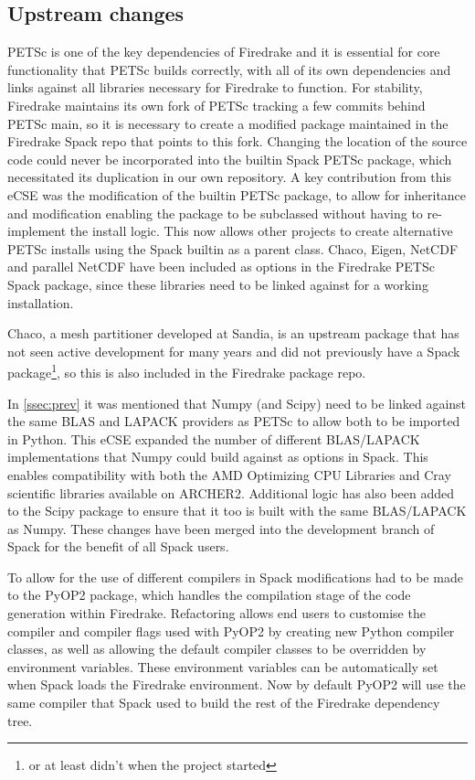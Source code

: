 \documentclass[a4paper,11pt]{article}
\begin{document}
\subsection{Upstream changes}
\label{ssec:changes}
PETSc is one of the key dependencies of Firedrake and it is essential for core functionality that PETSc builds correctly, with all of its own dependencies and links against all libraries necessary for Firedrake to function.
For stability, Firedrake maintains its own fork of PETSc tracking a few commits behind PETSc main, so it is necessary to create a modified package maintained in the Firedrake Spack repo that points to this fork.
Changing the location of the source code could never be incorporated into the builtin Spack PETSc package, which necessitated its duplication in our own repository.
A key contribution from this eCSE was the modification of the builtin PETSc package, to allow for inheritance and modification enabling the package to be subclassed without having to re-implement the install logic.
This now allows other projects to create alternative PETSc installs using the Spack builtin as a parent class.
Chaco, Eigen, NetCDF and parallel NetCDF have been included as options in the Firedrake PETSc Spack package, since these libraries need to be linked against for a working installation.

Chaco, a mesh partitioner developed at Sandia, is an upstream package that has not seen active development for many years and did not previously have a Spack package\footnote{or at least didn't when the project started}, so this is also included in the Firedrake package repo.

In \cref{ssec:prev} it was mentioned that Numpy (and Scipy) need to be linked against the same BLAS and LAPACK providers as PETSc to allow both to be imported in Python.
This eCSE expanded the number of different BLAS/LAPACK implementations that Numpy could build against as options in Spack.
This enables compatibility with both the AMD Optimizing CPU Libraries and Cray scientific libraries available on ARCHER2.
Additional logic has also been added to the Scipy package to ensure that it too is built with the same BLAS/LAPACK as Numpy.
These changes have been merged into the development branch of Spack for the benefit of all Spack users.

To allow for the use of different compilers in Spack modifications had to be made to the PyOP2 package, which handles the compilation stage of the code generation within Firedrake.
Refactoring allows end users to customise the compiler and compiler flags used with PyOP2 by creating new Python compiler classes, as well as allowing the default compiler classes to be overridden by environment variables.
These environment variables can be automatically set when Spack loads the Firedrake environment.
Now by default PyOP2 will use the same compiler that Spack used to build the rest of the Firedrake dependency tree.
\end{document}
